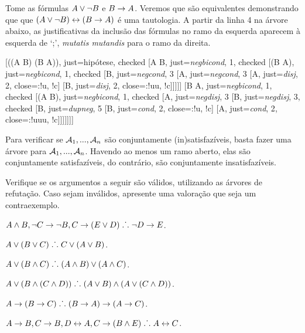 Tome as fórmulas $A \vee \neg B$ e $B \rightarrow A$.
Veremos que são equivalentes demonstrando que que $(A \vee \neg B) \leftrightarrow (B \rightarrow A)$ é uma tautologia.
A partir da linha 4 na árvore abaixo, as justificativas da inclusão das fórmulas no ramo da esquerda aparecem à esquerda de `;', \emph{mutatis mutandis} para o ramo da direita.

	\begin{center}
		\begin{tableau}
			{
			}
			[\enot((A \eor \enot B) \eiff (B \eif A)), just=hipótese, checked
				[A \eor \enot B, just={\emph{negbicond}, 1}, checked
				[\enot(B \eif A), just={\emph{negbicond}, 1}, checked
					[B, just={\emph{negcond}, 3}
					[\enot A, just={\emph{negcond}, 3}
						[A, just={\emph{disj}, 2}, close={:!u, !c}]
						[\enot B, just={\emph{disj}, 2}, close={:!uu, !c}]]]]]
				[B \eif A, just={\emph{negbicond}, 1}, checked
				[\enot(A \eor \enot B), just={\emph{negbicond}, 1}, checked
				[\enot A, just={\emph{negdisj}, 3}
					[\enot \enot B, just={\emph{negdisj}, 3}, checked
					[B, just={\emph{dupneg}, 5}
						[\enot B, just={\emph{cond}, 2}, close={:!u, !c}]
						[A, just={\emph{cond}, 2}, close={:!uuu, !c}]]]]]]]
		\end{tableau}
	\end{center}

Para verificar se $\mathcal{A}_1, ..., \mathcal{A}_n$ são conjuntamente (in)satisfazíveis, basta fazer uma árvore para $\mathcal{A}_1, ..., \mathcal{A}_n$. 
Havendo ao menos um ramo aberto, elas são conjuntamente satisfazíveis, do contrário, são conjuntamente insatisfazíveis.

\practiceproblems

\problempart
\label{pr.TT.truthtrees.args}
Verifique se os argumentos a seguir são válidos, utilizando as árvores de refutação. Caso sejam inválidos, apresente uma valoração que seja um contraexemplo.
\begin{earg}
	\item $A \wedge B, \neg C \rightarrow \neg B, C \rightarrow (E \vee D) \mathrel{\ldotp\dot{}\,\ldotp} \neg D \rightarrow E$.
	\item $A \vee (B \vee C) \mathrel{\ldotp\dot{}\,\ldotp} C \vee (A \vee B)$.
	\item $A \vee (B \wedge C) \mathrel{\ldotp\dot{}\,\ldotp} (A \wedge B) \vee (A \wedge C)$.
	\item $A \vee (B \wedge (C \wedge D)) \mathrel{\ldotp\dot{}\,\ldotp} (A \vee B) \wedge (A \vee (C \wedge D))$.
	\item $A \rightarrow (B \rightarrow C) \mathrel{\ldotp\dot{}\,\ldotp} (B \rightarrow A) \rightarrow (A \rightarrow C)$.
	\item $A \rightarrow B, C \rightarrow B, D \leftrightarrow A, C \rightarrow (B \wedge E) \mathrel{\ldotp\dot{}\,\ldotp} A \leftrightarrow C$.
\end{earg}
